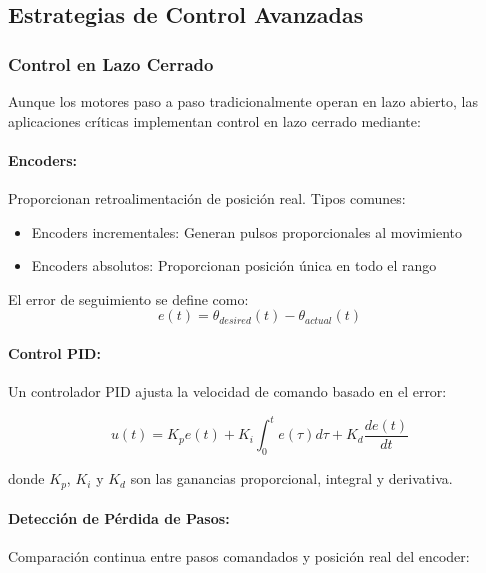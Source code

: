 \subsection{Estrategias de Control Avanzadas}

\subsubsection{Control en Lazo Cerrado}

Aunque los motores paso a paso tradicionalmente operan en lazo abierto, las aplicaciones críticas implementan control en lazo cerrado mediante:

\paragraph{Encoders:}

Proporcionan retroalimentación de posición real. Tipos comunes:
\begin{itemize}
    \item Encoders incrementales: Generan pulsos proporcionales al movimiento
    \item Encoders absolutos: Proporcionan posición única en todo el rango
\end{itemize}

El error de seguimiento se define como:
\begin{equation}
e(t) = \theta_{desired}(t) - \theta_{actual}(t)
\end{equation}

\paragraph{Control PID:}

Un controlador PID ajusta la velocidad de comando basado en el error:

\begin{equation}
u(t) = K_p e(t) + K_i \int_0^t e(\tau)d\tau + K_d \frac{de(t)}{dt}
\end{equation}

donde $K_p$, $K_i$ y $K_d$ son las ganancias proporcional, integral y derivativa.

\paragraph{Detección de Pérdida de Pasos:}

Comparación continua entre pasos comandados y posición real del encoder:

